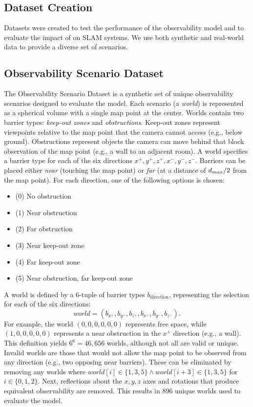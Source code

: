 \subsection{Dataset Creation}

Datasets were created to test the performance of the observability model and to evaluate the impact of \vbee{} on SLAM systems. We use both synthetic and real-world data to provide a diverse set of scenarios.

\subsection{Observability Scenario Dataset}
\label{sec:observability_scenario_dataset}

The Observability Scenario Dataset is a synthetic set of unique observability scenarios designed to evaluate the \knn{} model. Each scenario (a \textit{world}) is represented as a spherical volume with a single map point at the center. Worlds contain two barrier types: \textit{keep-out zones} and \textit{obstructions}. Keep-out zones represent viewpoints relative to the map point that the camera cannot access (e.g., below ground). Obstructions represent objects the camera can move behind that block observation of the map point (e.g., a wall to an adjacent room). A world specifies a barrier type for each of the six directions \(x^+, y^+, z^+, x^-, y^-, z^-\). Barriers can be placed either \textit{near} (touching the map point) or \textit{far} (at a distance of \(d_{max}/2\) from the map point). For each direction, one of the following options is chosen:
\begin{itemize}
    \item (0) No obstruction
    \item (1) Near obstruction
    \item (2) Far obstruction
    \item (3) Near keep-out zone
    \item (4) Far keep-out zone
    \item (5) Near obstruction, far keep-out zone
\end{itemize}

A world is defined by a 6-tuple of barrier types \(b_{\text{direction}}\), representing the selection for each of the six directions:
\[
    world = (b_{x^+}, b_{y^+}, b_{z^+}, b_{x^-}, b_{y^-}, b_{z^-}).
\]
For example, the world \((0,0,0,0,0,0)\) represents free space, while \((1,0,0,0,0,0)\) represents a near obstruction in the \(x^+\) direction (e.g., a wall). This definition yields \(6^6 = 46{,}656\) worlds, although not all are valid or unique. Invalid worlds are those that would not allow the map point to be observed from any direction (e.g., two opposing near barriers). These can be eliminated by removing any worlds where \(world[i] \in \{1,3,5\} \land world[i+3]\in \{1,3,5\}\) for \(i \in \{0,1,2\}\). Next, reflections about the \(x,y,z\) axes and rotations that produce equivalent observability are removed. This results in 896 unique worlds used to evaluate the model.

